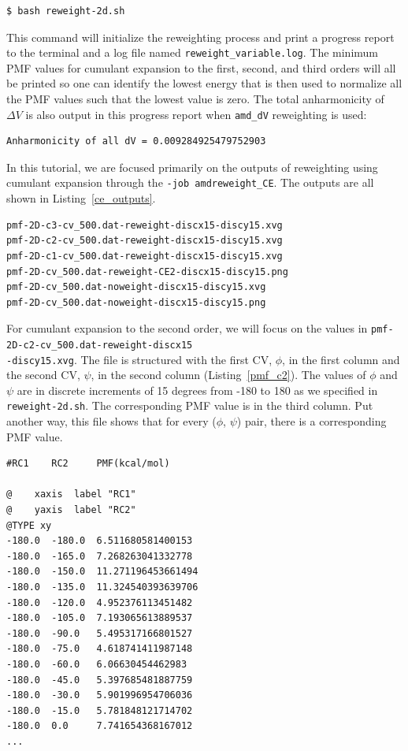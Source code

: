 \documentclass[9pt,tutorial]{livecoms}
\begin{document}
\begin{lstlisting}[style=MyBash]
$ bash reweight-2d.sh
\end{lstlisting}

This command will initialize the reweighting process and print a progress report to the terminal and a log file named \texttt{reweight\_variable.log}. The minimum PMF values for cumulant expansion to the first, second, and third orders will all be printed so one can identify the lowest energy that is then used to normalize all the PMF values such that the lowest value is zero. The total anharmonicity of $\Delta{V}$ is also output in this progress report when \texttt{amd\_dV} reweighting is used:

\begin{lstlisting}[label=anharm, basicstyle=\small, backgroundcolor=\color{light-gray}]
Anharmonicity of all dV = 0.009284925479752903
\end{lstlisting}

In this tutorial, we are focused primarily on the outputs of reweighting using cumulant expansion through the \texttt{-job amdreweight\_CE}. The outputs are all shown in Listing~\ref{ce_outputs}.

\bigskip
\begin{lstlisting}[label=ce_outputs, caption=Reweighting Outputs, basicstyle=\small, backgroundcolor=\color{light-gray}]
pmf-2D-c3-cv_500.dat-reweight-discx15-discy15.xvg
pmf-2D-c2-cv_500.dat-reweight-discx15-discy15.xvg
pmf-2D-c1-cv_500.dat-reweight-discx15-discy15.xvg
pmf-2D-cv_500.dat-reweight-CE2-discx15-discy15.png
pmf-2D-cv_500.dat-noweight-discx15-discy15.xvg
pmf-2D-cv_500.dat-noweight-discx15-discy15.png
\end{lstlisting}

For cumulant expansion to the second order, we will focus on the values in \texttt{pmf-2D-c2-cv\_500.dat-reweight-discx15\\-discy15.xvg}. The file is structured with the first CV, $\phi$, in the first column and the second CV, $\psi$, in the second column (Listing~\ref{pmf_c2}). The values of $\phi$ and $\psi$ are in discrete increments of 15 degrees from -180 to 180 as we specified in \texttt{reweight-2d.sh}. The corresponding PMF value is in the third column. Put another way, this file shows that for every ($\phi$, $\psi$) pair, there is a corresponding PMF value.

\bigskip
\begin{lstlisting}[label=pmf_c2, caption=pmf-2D-c2-cv\_500.dat-reweight-discx15-discy15.xvg, basicstyle=\small, backgroundcolor=\color{light-gray}]
#RC1    RC2     PMF(kcal/mol)

@    xaxis  label "RC1"
@    yaxis  label "RC2"
@TYPE xy
-180.0  -180.0  6.511680581400153
-180.0  -165.0  7.268263041332778
-180.0  -150.0  11.271196453661494
-180.0  -135.0  11.324540393639706
-180.0  -120.0  4.952376113451482
-180.0  -105.0  7.193065613889537
-180.0  -90.0   5.495317166801527
-180.0  -75.0   4.618741411987148
-180.0  -60.0   6.06630454462983
-180.0  -45.0   5.397685481887759
-180.0  -30.0   5.901996954706036
-180.0  -15.0   5.781848121714702
-180.0  0.0     7.741654368167012
...
\end{lstlisting}
\end{document}
